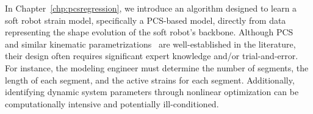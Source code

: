 In Chapter~\ref{chp:pcsregression}, we introduce an algorithm designed to learn a soft robot strain model, specifically a \gls{PCS}-based model, directly from data representing the shape evolution of the soft robot’s backbone.
Although \gls{PCS}~\citep{renda2018discrete} and similar kinematic parametrizations~\citep{alessi2024rod} are well-established in the literature, their design often requires significant expert knowledge and/or trial-and-error. For instance, the modeling engineer must determine the number of segments, the length of each segment, and the active strains for each segment.
Additionally, identifying dynamic system parameters through nonlinear optimization can be computationally intensive and potentially ill-conditioned.
